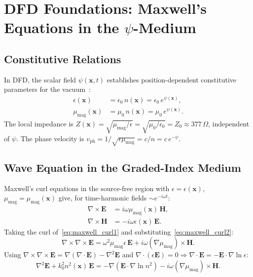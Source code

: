 \documentclass[journal,twocolumn]{IEEEtran}
\begin{document}
\section{DFD Foundations: Maxwell's Equations in the $\psi$-Medium}
\label{sec:foundations}

\subsection{Constitutive Relations}

In DFD, the scalar field $\psi(\mathbf{x},t)$ establishes position-dependent
constitutive parameters for the vacuum~\cite{Alcock2025_DFD}:
\begin{align}
\epsilon(\mathbf{x}) &= \epsilon_0\,n(\mathbf{x}) = \epsilon_0\,e^{\psi(\mathbf{x})},
\label{eq:epsilon}\\
\mu_{\text{mag}}(\mathbf{x}) &= \mu_0\,n(\mathbf{x}) = \mu_0\,e^{\psi(\mathbf{x})}.
\label{eq:mu_mag}
\end{align}
The local impedance is $Z(\mathbf{x}) = \sqrt{\mu_{\text{mag}}/\epsilon}
= \sqrt{\mu_0/\epsilon_0} = Z_0 \approx 377\,\Omega$, independent of $\psi$.
The phase velocity is $v_\text{ph} = 1/\sqrt{\epsilon\mu_{\text{mag}}}
= c/n = c\,e^{-\psi}$.

\subsection{Wave Equation in the Graded-Index Medium}

Maxwell's curl equations in the source-free region with
$\epsilon = \epsilon(\mathbf{x})$, $\mu_{\text{mag}} = \mu_{\text{mag}}(\mathbf{x})$
give, for time-harmonic fields $\sim e^{-i\omega t}$:
\begin{align}
\nabla \times \mathbf{E} &= i\omega\mu_{\text{mag}}(\mathbf{x})\,\mathbf{H},
\label{eq:maxwell_curl1}\\
\nabla \times \mathbf{H} &= -i\omega\epsilon(\mathbf{x})\,\mathbf{E}.
\label{eq:maxwell_curl2}
\end{align}
Taking the curl of~\eqref{eq:maxwell_curl1} and substituting~\eqref{eq:maxwell_curl2}:
\begin{equation}
\nabla \times \nabla \times \mathbf{E}
= \omega^2\mu_{\text{mag}}\epsilon\,\mathbf{E}
+ i\omega(\nabla\mu_{\text{mag}}) \times \mathbf{H}.
\label{eq:curl_curl}
\end{equation}
Using $\nabla \times \nabla \times \mathbf{E} = \nabla(\nabla\cdot\mathbf{E})
- \nabla^2\mathbf{E}$ and $\nabla\cdot(\epsilon\mathbf{E}) = 0
\Rightarrow \nabla\cdot\mathbf{E} = -\mathbf{E}\cdot\nabla\ln\epsilon$:
\begin{equation}
\nabla^2\mathbf{E} + k_0^2 n^2(\mathbf{x})\,\mathbf{E}
= -\nabla\!\left(\mathbf{E}\cdot\nabla\ln n^2\right)
- i\omega(\nabla\mu_{\text{mag}}) \times \mathbf{H}.
\label{eq:full_wave}
\end{equation}
\end{document}
